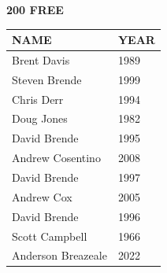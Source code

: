 \begin{table}[H]
\centering
\begin{minipage}[t]{0.6\textwidth}
\centering
\textbf{200 FREE}\\[0.1cm]
\begin{tabular}{@{}p{2.8cm}p{1.2cm}@{}}
\hline
    \textbf{NAME} & \textbf{YEAR} \\
\hline
    Brent Davis & 1989 \\
    Steven Brende & 1999 \\
    Chris Derr & 1994 \\
    Doug Jones & 1982 \\
    David Brende & 1995 \\
    Andrew Cosentino & 2008 \\
    David Brende & 1997 \\
    Andrew Cox & 2005 \\
    David Brende & 1996 \\
    Scott Campbell & 1966 \\
    Anderson Breazeale & 2022 \\
\hline
\end{tabular}
\end{minipage}
\end{table}

